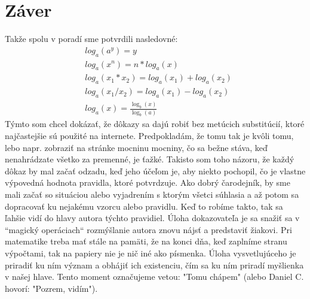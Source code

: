 \documentclass{article}
\begin{document}
\section{Záver}
Takže spolu v poradí sme potvrdili nasledovné:
\begin{align}
	& log_a(a^y) = y \\
	& log_a(x^n) = n * log_a(x) \\
	& log_a(x_1 * x_2) = log_a(x_1) + log_a(x_2) \\
	& log_a(x_1/x_2) = log_a(x_1) - log_a(x_2) \\
	& log_a(x) = \frac{\log_b(x)}{\log_b(a)}
\end{align}
Týmto som chcel dokázať, že dôkazy sa dajú robiť bez metúcich substitúcií, ktoré najčastejšie sú použité na internete.
Predpokladám, že tomu tak je kvôli tomu, lebo napr. zobraziť na stránke mocninu mocniny, čo sa bežne stáva, keď nenahrádzate všetko za premenné, je ťažké.
Takisto som toho názoru, že každý dôkaz by mal začať odzadu, keď jeho účeľom je, aby niekto pochopil, čo je vlastne výpovedná hodnota pravidla, ktoré potvrdzuje.
Ako dobrý čarodejník, by sme mali začať so situáciou alebo vyjadrením s ktorým všetci súhlasia a až potom sa dopracovať ku nejakému vzorcu alebo pravidlu.
Keď to robíme takto, tak sa ľahšie vidí do hlavy autora týchto pravidiel. Úloha dokazovateľa je sa snažiť sa v ``magický operáciach`` rozmýšlanie autora znovu nájsť a predstaviť žiakovi.
Pri matematike treba mať stále na pamäti, že na konci dňa, keď zaplníme stranu výpočtami, tak na papiery nie je nič iné ako písmenka. Úloha vysvetlujúceho je priradiť ku ním význam a obhájiť ich existenciu, čím sa ku ním priradí myšlienka v našej hlave. Tento moment označujeme vetou: "Tomu chápem" (alebo Daniel C. hovorí: "Pozrem, vidím").
\end{document}
